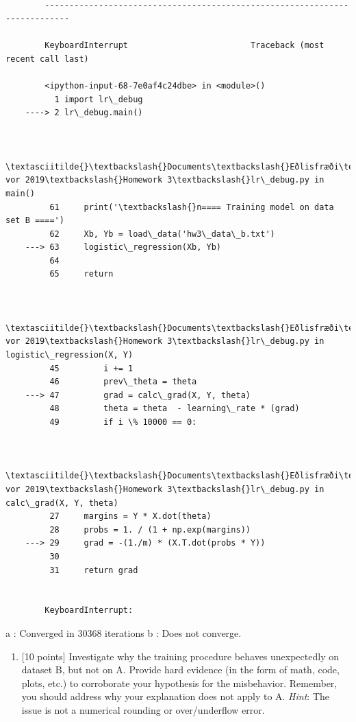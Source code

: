 \documentclass[11pt]{article}
\providecommand{\tightlist}{%
      \setlength{\itemsep}{0pt}\setlength{\parskip}{0pt}}
\begin{document}
    \begin{Verbatim}[commandchars=\\\{\}]

        ---------------------------------------------------------------------------

        KeyboardInterrupt                         Traceback (most recent call last)

        <ipython-input-68-7e0af4c24dbe> in <module>()
          1 import lr\_debug
    ----> 2 lr\_debug.main()
    

        \textasciitilde{}\textbackslash{}Documents\textbackslash{}Eðlisfræði\textbackslash{}Gervigreind vor 2019\textbackslash{}Homework 3\textbackslash{}lr\_debug.py in main()
         61     print('\textbackslash{}n==== Training model on data set B ====')
         62     Xb, Yb = load\_data('hw3\_data\_b.txt')
    ---> 63     logistic\_regression(Xb, Yb)
         64 
         65     return
    

        \textasciitilde{}\textbackslash{}Documents\textbackslash{}Eðlisfræði\textbackslash{}Gervigreind vor 2019\textbackslash{}Homework 3\textbackslash{}lr\_debug.py in logistic\_regression(X, Y)
         45         i += 1
         46         prev\_theta = theta
    ---> 47         grad = calc\_grad(X, Y, theta)
         48         theta = theta  - learning\_rate * (grad)
         49         if i \% 10000 == 0:
    

        \textasciitilde{}\textbackslash{}Documents\textbackslash{}Eðlisfræði\textbackslash{}Gervigreind vor 2019\textbackslash{}Homework 3\textbackslash{}lr\_debug.py in calc\_grad(X, Y, theta)
         27     margins = Y * X.dot(theta)
         28     probs = 1. / (1 + np.exp(margins))
    ---> 29     grad = -(1./m) * (X.T.dot(probs * Y))
         30 
         31     return grad
    

        KeyboardInterrupt: 

    \end{Verbatim}

    a : Converged in 30368 iterations b : Does not converge.

    \begin{enumerate}
\def\labelenumi{\alph{enumi})}
\setcounter{enumi}{1}
\tightlist
\item
  {[}10 points{]} Investigate why the training procedure behaves
  unexpectedly on dataset B, but not on A. Provide hard evidence (in the
  form of math, code, plots, etc.) to corroborate your hypothesis for
  the misbehavior. Remember, you should address why your explanation
  does not apply to A. \emph{Hint}: The issue is not a numerical
  rounding or over/underflow error.
\end{enumerate}
\end{document}
